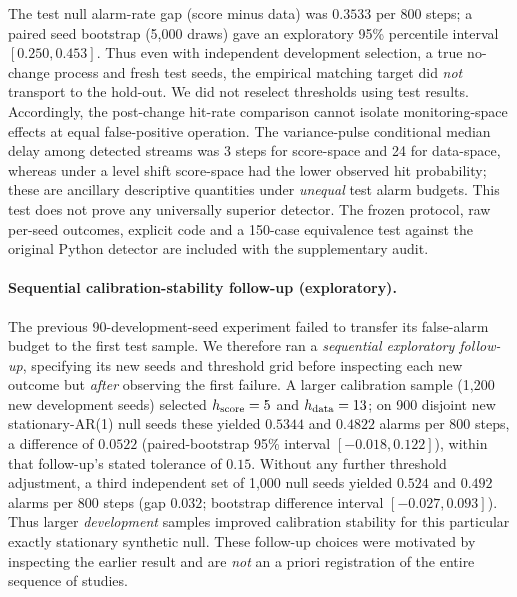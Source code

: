 \documentclass[10pt]{article}
\begin{document}
The test null alarm-rate gap (score minus data) was $0.3533$ per
800 steps; a paired seed bootstrap (5,000 draws) gave an exploratory
95\% percentile interval $[0.250,0.453]$. Thus even with
independent development selection, a true no-change process and
fresh test seeds, the empirical matching target did \emph{not}
transport to the hold-out. We did not reselect thresholds using test
results. Accordingly, the post-change hit-rate comparison cannot
isolate monitoring-space effects at equal false-positive operation.
The variance-pulse conditional median delay among detected streams
was 3 steps for score-space and 24 for data-space, whereas under a
level shift score-space had the lower observed hit probability; these
are ancillary descriptive quantities under \emph{unequal} test alarm
budgets. This test does not prove any universally superior detector.
The frozen protocol, raw per-seed outcomes, explicit code and a
150-case equivalence test against the original Python detector are
included with the supplementary audit.


\paragraph{Sequential calibration-stability follow-up (exploratory).}
The previous 90-development-seed experiment failed to transfer its
false-alarm budget to the first test sample. We therefore ran a
\emph{sequential exploratory follow-up}, specifying its new seeds and
threshold grid before inspecting each new outcome but \emph{after}
observing the first failure. A larger calibration sample (1,200
new development seeds) selected $h_{\rm score}=5$ and
$h_{\rm data}=13$; on 900 disjoint new stationary-AR(1) null seeds
these yielded $0.5344$ and $0.4822$ alarms per 800 steps, a difference
of $0.0522$ (paired-bootstrap 95\% interval $[-0.018,0.122]$), within
that follow-up's stated tolerance of $0.15$. Without any further
threshold adjustment, a third independent set of 1,000 null seeds
yielded $0.524$ and $0.492$ alarms per 800 steps (gap $0.032$;
bootstrap difference interval $[-0.027,0.093]$). Thus larger
\emph{development} samples improved calibration stability for this
particular exactly stationary synthetic null. These follow-up choices
were motivated by inspecting the earlier result and are \emph{not}
an a priori registration of the entire sequence of studies.
\end{document}
